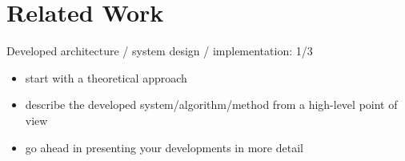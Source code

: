 
\chapter{Related Work}%
\label{sec:related_work}

Developed architecture / system design / implementation: 1/3

\begin{itemize}
    \item start with a theoretical approach
    \item describe the developed system/algorithm/method from a high-level point of view
    \item go ahead in presenting your developments in more detail
\end{itemize}
